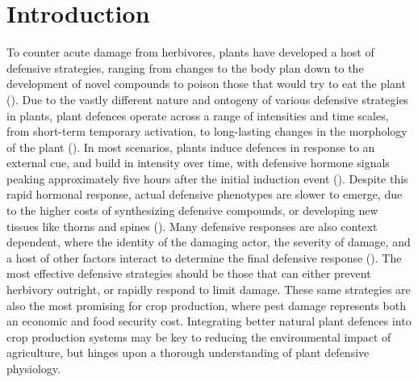 \documentclass[12pt, letterpaper, ]{report}
\begin{document}
\section{Introduction}

To counter acute damage from herbivores, plants have developed a host of defensive strategies, ranging from changes to the body plan down to the development of novel compounds to poison those that would try to eat the plant (\cite{agrawal_plant_2006}). Due to the vastly different nature and ontogeny of various defensive strategies in plants, plant defences operate across a range of intensities and time scales, from short-term temporary activation, to long-lasting changes in the morphology of the plant (\cite{agrawal_plant_2006, karban_induced_1989}). In most scenarios, plants induce defences in response to an external cue, and build in intensity over time, with defensive hormone signals peaking approximately five hours after the initial induction event (\cite{schmelz_quantitative_2003}). Despite this rapid hormonal response, actual defensive phenotypes are slower to emerge, due to the higher costs of synthesizing defensive compounds, or developing new tissues like thorns and spines (\cite{karban_induced_1989}). Many defensive responses are also context dependent, where the identity of the damaging actor, the severity of damage, and a host of other factors interact to determine the final defensive response (\cite{waterman_simulated_2019}). The most effective defensive strategies should be those that can either prevent herbivory outright, or rapidly respond to limit damage. These same strategies are also the most promising for crop production, where pest damage represents both an economic and food security cost. Integrating better natural plant defences into crop production systems may be key to reducing the environmental impact of agriculture, but hinges upon a thorough understanding of plant defensive physiology.
\end{document}
